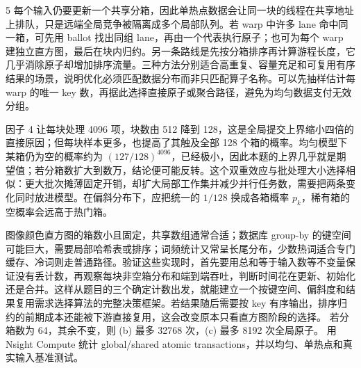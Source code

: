\begin{solutionexercise}{5}
每个输入仍要更新一个共享分箱，因此单热点数据会让同一块的线程在共享地址上排队，只是远端全局竞争被隔离成多个局部队列。若 warp 中许多 lane 命中同一箱，可先用 ballot 找出同组 lane，再由一个代表执行原子；也可为每个 warp 建独立直方图，最后在块内归约。另一条路线是先按分箱排序再计算游程长度，它几乎消除原子却增加排序流量。三种方法分别适合高重复、容量充足和可复用有序结果的场景，说明优化必须匹配数据分布而非只匹配算子名称。可以先抽样估计每 warp 的唯一 key 数，再据此选择直接原子或聚合路径，避免为均匀数据支付无效分组。

因子 4 让每块处理 4096 项，块数由 512 降到 128，这是全局提交上界缩小四倍的直接原因；但每块样本更多，也提高了其触及全部 128 个箱的概率。均匀模型下某箱仍为空的概率约为 $(127/128)^{4096}$，已经极小，因此本题的上界几乎就是期望值；若分箱数扩大到数万，结论便可能反转。这个双重效应与批处理大小选择相似：更大批次摊薄固定开销，却扩大局部工作集并减少并行任务数，需要把两条变化同时放进模型。在偏斜分布下，应把统一的 $1/128$ 换成各箱概率 $p_k$，稀有箱的空概率会远高于热门箱。

图像颜色直方图的箱数小且固定，共享数组通常合适；数据库 group-by 的键空间可能巨大，需要局部哈希表或排序；词频统计又常呈长尾分布，少数热词适合专门缓存、冷词则走普通路径。验证这些实现时，首先要用总和等于输入数等不变量保证没有丢计数，再观察每块非空箱分布和端到端吞吐，判断时间花在更新、初始化还是合并。这样从题目的三个确定计数出发，就能建立一个按键空间、偏斜度和结果复用需求选择算法的完整决策框架。若结果随后需要按 key 有序输出，排序归约的前期成本还能被下游直接复用，这会改变原本只看直方图阶段的选择。
\variantheading 若分箱数为 64，其余不变，则 (b) 最多 32768 次，(c) 最多 8192 次全局原子。
\practiceheading 用 Nsight Compute 统计 global/shared atomic transactions，并以均匀、单热点和真实输入基准测试。
\end{solutionexercise}
